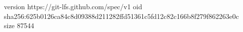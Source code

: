version https://git-lfs.github.com/spec/v1
oid sha256:625b0126ca84c8d09388d211282ffd51361c5fd12c82c166b8f279f862263e0c
size 87544
